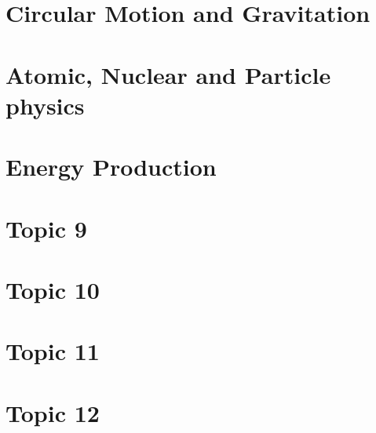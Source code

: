 \documentclass{article}
\begin{document}
\section{Circular Motion and Gravitation}



\newpage
\section{Atomic, Nuclear and Particle physics}



\newpage
\section{Energy Production}



\newpage
\section{Topic 9}

%

\newpage
\section{Topic 10}

%

\newpage
\section{Topic 11}

%

\newpage
\section{Topic 12}

%
\end{document}
